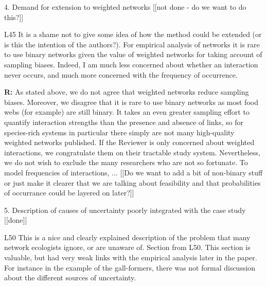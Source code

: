 \documentclass[12pt]{letter}
\newenvironment{refquote}{\bigskip \begin{it}}{\end{it}\smallskip}
\begin{document}
	4. Demand for extension to weighted networks [[not done - do we want to do this?]]

		\begin{refquote}
		L45 It is a shame not to give some idea of how the method could be extended (or is this the intention of the authors?). For empirical analysis of networks it is rare to use binary networks given the value of weighted networks for taking account of sampling biases. Indeed, I am much less concerned about whether an interaction never occurs, and much more concerned with the frequency of occurrence.
		\end{refquote}

		\textbf{R:} As stated above, we do not agree that weighted networks reduce sampling biases. Moreover, we disagree that it is rare to use binary networks as most food webs (for example) are still binary. It takes an even greater sampling effort to quantify interaction strengths than the presence and absence of links, so for species-rich systems in particular there simply are not many high-quality weighted networks published. If the Reviewer is only concerned about weighted interactions, we congratulate them on their tractable study system. Nevertheless, we do not wish to exclude the many researchers who are not so fortunate.
		\smallskip
		To model frequencies of interactions, ...
			 [[Do we want to add a bit of non-binary stuff or just make it clearer that we are talking about feasibility and that probabilities of occurrance could be layered on later?]]


	5. Description of causes of uncertainty poorly integrated with the case study [[done]]

		\begin{refquote}
		L50 This is a nice and clearly explained description of the problem that many network ecologists ignore, or are unaware of.
		Section from L50. This section is valuable, but had very weak links with the empirical analysis later in the paper. For instance in the example of the gall-formers, there was not formal discussion about the different sources of uncertainty. 
		\end{refquote}
\end{document}
